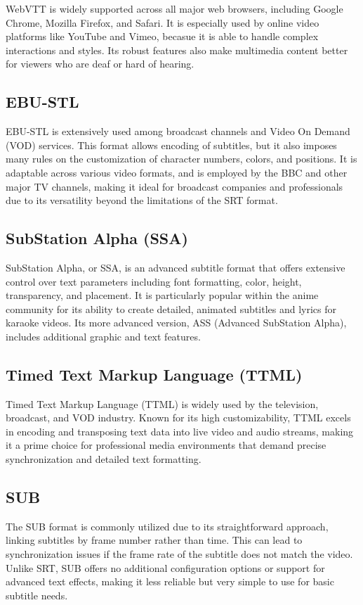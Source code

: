 WebVTT is widely supported across all major web browsers, including Google Chrome, Mozilla Firefox, and Safari. It is especially used by online video platforms like YouTube and Vimeo, becasue it is able to handle complex interactions and styles. Its robust features also make multimedia content better for viewers who are deaf or hard of hearing.

\subsection{EBU-STL}
EBU-STL is extensively used among broadcast channels and Video On Demand (VOD) services. This format allows encoding of subtitles, but it also imposes many rules on the customization of character numbers, colors, and positions. It is adaptable across various video formats, and is employed by the BBC and other major TV channels, making it ideal for broadcast companies and professionals due to its versatility beyond the limitations of the SRT format.

\subsection{SubStation Alpha (SSA)}
SubStation Alpha, or SSA, is an advanced subtitle format that offers extensive control over text parameters including font formatting, color, height, transparency, and placement. It is particularly popular within the anime community for its ability to create detailed, animated subtitles and lyrics for karaoke videos. Its more advanced version, ASS (Advanced SubStation Alpha), includes additional graphic and text features.

\subsection{Timed Text Markup Language (TTML)}
Timed Text Markup Language (TTML) is widely used by the television, broadcast, and VOD industry. Known for its high customizability, TTML excels in encoding and transposing text data into live video and audio streams, making it a prime choice for professional media environments that demand precise synchronization and detailed text formatting.

\subsection{SUB}
The SUB format is commonly utilized due to its straightforward approach, linking subtitles by frame number rather than time. This can lead to synchronization issues if the frame rate of the subtitle does not match the video. Unlike SRT, SUB offers no additional configuration options or support for advanced text effects, making it less reliable but very simple to use for basic subtitle needs.

